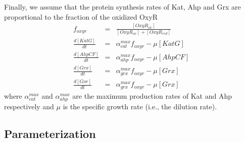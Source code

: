 \documentclass[10pt]{article}
\begin{document}
Finally, we assume that the protein synthesis rates of Kat, Ahp and Grx are proportional to the fraction of the oxidized OxyR
\begin{eqnarray}
f_{oxyr} &=& \frac{[OxyR_{ox}]}{[OxyR_{ox}]+[OxyR_{red}]} \\
\frac{d[KatG]}{dt} &=& \alpha_{cat}^{max}f_{oxyr}-\mu[KatG] \\
\frac{d[AhpCF]}{dt} &=& \alpha_{ahp}^{max}f_{oxyr}-\mu[AhpCF]\\
\frac{d[Grx]}{dt} &=& \alpha_{grx}^{max}f_{oxyr}-\mu[Grx] \\
\frac{d[Gor]}{dt} &=& \alpha_{grx}^{max}f_{oxyr}-\mu[Grx]
\end{eqnarray}
where $\alpha_{cat}^{max}$ and $\alpha_{ahp}^{max}$ are the maximum production rates of Kat and Ahp respectively and $\mu$ is the specific growth rate (i.e., the dilution rate).

\subsection{Parameterization}
\end{document}
